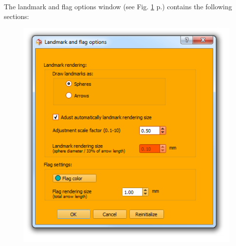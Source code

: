 The landmark and flag options window (see Fig. \ref{landmarks_flags_options} p.\pageref{landmarks_flags_options}) contains the following sections:
\begin{figure}
  \centering  
 \includegraphics[scale=0.5]{images/08/landmark_flag_options.png}
\label{landmarks_flags_options}
\end{figure}

